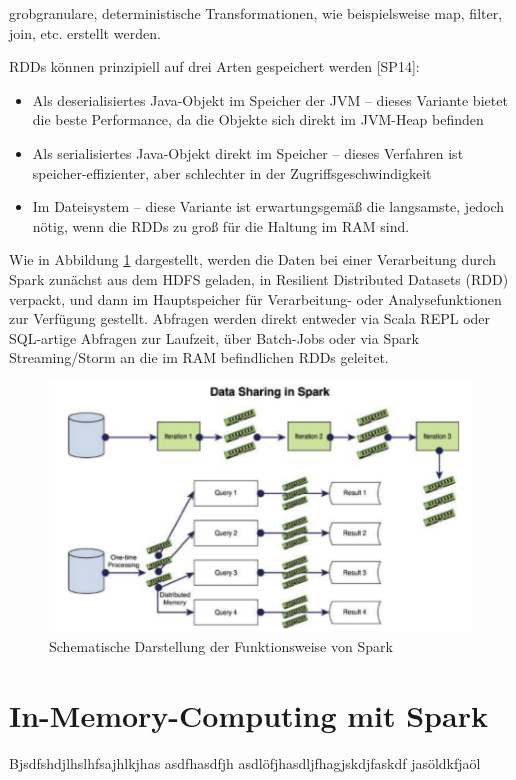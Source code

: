 grobgranulare, deterministische Transformationen, wie beispielsweise map, filter, join, etc. erstellt werden. 

RDDs können prinzipiell auf drei Arten gespeichert werden [SP14]:
\begin{itemize}
		\item Als deserialisiertes Java-Objekt im Speicher der JVM – dieses Variante bietet die beste Performance, da die Objekte sich direkt im JVM-Heap befinden
		\item Als serialisiertes Java-Objekt direkt im Speicher – dieses Verfahren ist speicher-effizienter, aber schlechter in der Zugriffsgeschwindigkeit
		\item Im Dateisystem – diese Variante ist erwartungsgemäß die langsamste, jedoch nötig, wenn die RDDs zu groß für die Haltung im RAM sind. 		
\end{itemize}	



Wie in Abbildung \ref{section:rdd} dargestellt, werden die Daten bei einer Verarbeitung durch Spark zunächst aus dem HDFS geladen, in Resilient Distributed Datasets (RDD) verpackt, und dann im Hauptspeicher für Verarbeitung- oder Analysefunktionen zur Verfügung gestellt. Abfragen werden direkt entweder via Scala REPL oder SQL-artige Abfragen zur Laufzeit, über Batch-Jobs oder via Spark Streaming/Storm an die im RAM befindlichen RDDs geleitet.

\begin{figure}[htb!]
\centering
\includegraphics[width=1.0\textwidth]{bilder/3_spark.png}
\caption{Schematische Darstellung der Funktionsweise von Spark }
\label{fig:sparkfunkt}
\end{figure}

\section{In-Memory-Computing mit Spark}
\label{section:rdd}

Bjsdfshdjlhslhfsajhlkjhas
asdfhasdfjh
asdlöfjhasdljfhagjskdjfaskdf
jasöldkfjaöl
































